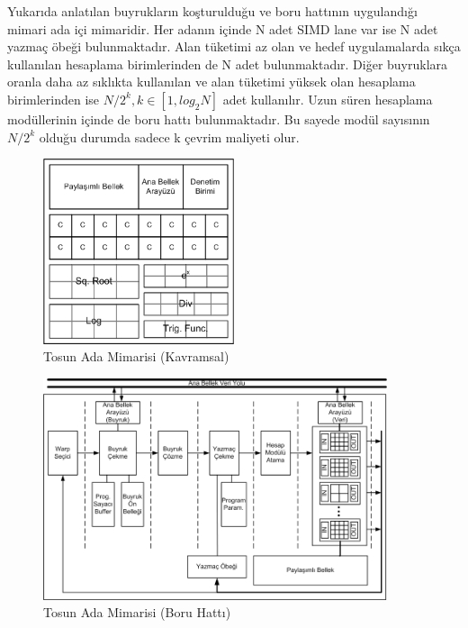 Yukarıda anlatılan buyrukların koşturulduğu ve boru hattının uygulandığı mimari ada içi mimaridir. Her adanın içinde N adet SIMD lane var ise N adet yazmaç öbeği bulunmaktadır. Alan tüketimi az olan ve hedef uygulamalarda sıkça kullanılan hesaplama birimlerinden de N adet bulunmaktadır. Diğer buyruklara oranla daha az sıklıkta kullanılan ve alan tüketimi yüksek olan hesaplama birimlerinden ise $N/2^{k}, k\in[1,log_{2}N]$ adet kullanılır. Uzun süren hesaplama modüllerinin içinde de boru hattı bulunmaktadır. Bu sayede modül sayısının $N/2^{k}$ olduğu durumda sadece k çevrim maliyeti olur.\par
\begin{figure}[h]
\centering
\shorthandoff{=}
\includegraphics[width=0.5\textwidth]{gorsel/adaMimarisiEski.png}
\shorthandoff{=}
\caption{Tosun Ada Mimarisi (Kavramsal)}
\label{image:adaMimarisiEski}
\end{figure}

\begin{figure}[h]
\centering
\shorthandoff{=}
\includegraphics[width=0.9\textwidth]{gorsel/adaMimarisi.png}
\shorthandoff{=}
\caption{Tosun Ada Mimarisi (Boru Hattı)}
\label{image:adaMimarisi}
\end{figure}

